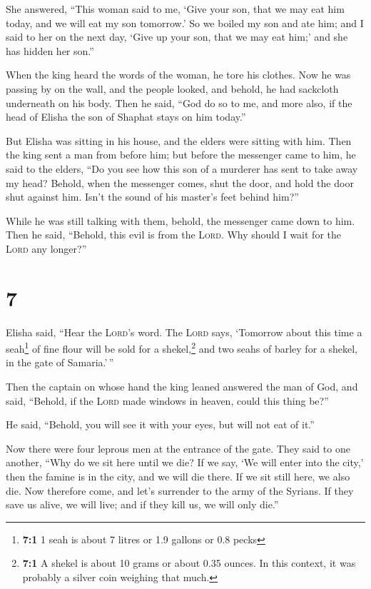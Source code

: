 She answered, ``This woman said to me, `Give your son, that we may eat
him today, and we will eat my son tomorrow.'  So we
boiled my son and ate him; and I said to her on the next day, `Give up
your son, that we may eat him;' and she has hidden her son.''

 When the king heard the words of the woman, he tore his
clothes. Now he was passing by on the wall, and the people looked, and
behold, he had sackcloth underneath on his body.  Then he
said, ``God do so to me, and more also, if the head of Elisha the son of
Shaphat stays on him today.''

 But Elisha was sitting in his house, and the elders were
sitting with him. Then the king sent a man from before him; but before
the messenger came to him, he said to the elders, ``Do you see how this
son of a murderer has sent to take away my head? Behold, when the
messenger comes, shut the door, and hold the door shut against him.
Isn't the sound of his master's feet behind him?''

 While he was still talking with them, behold, the
messenger came down to him. Then he said, ``Behold, this evil is from
the \textsc{Lord}. Why should I wait for the \textsc{Lord} any longer?''

\hypertarget{section-6}{%
\section{7}\label{section-6}}

 Elisha said, ``Hear the \textsc{Lord}'s word. The
\textsc{Lord} says, `Tomorrow about this time a seah\footnote{\textbf{7:1}
  1 seah is about 7 litres or 1.9 gallons or 0.8 pecks} of fine flour
will be sold for a shekel,\footnote{\textbf{7:1} A shekel is about 10
  grams or about 0.35 ounces. In this context, it was probably a silver
  coin weighing that much.} and two seahs of barley for a shekel, in the
gate of Samaria.'\,''

 Then the captain on whose hand the king leaned answered
the man of God, and said, ``Behold, if the \textsc{Lord} made windows in
heaven, could this thing be?''

He said, ``Behold, you will see it with your eyes, but will not eat of
it.''

 Now there were four leprous men at the entrance of the
gate. They said to one another, ``Why do we sit here until we die?
 If we say, `We will enter into the city,' then the famine
is in the city, and we will die there. If we sit still here, we also
die. Now therefore come, and let's surrender to the army of the Syrians.
If they save us alive, we will live; and if they kill us, we will only
die.''

